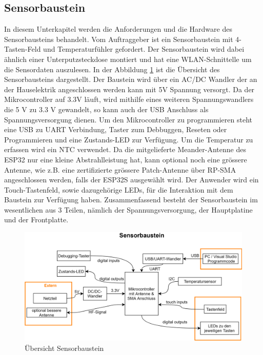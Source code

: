 \subsection{Sensorbaustein}\label{subsec: Sensorbaustein}
\label{sec: Sensorbaustein}
In diesem Unterkapitel werden die Anforderungen und die Hardware des Sensorbausteins behandelt.
Vom Auftraggeber ist ein Sensorbaustein mit 4-Tasten-Feld und Temperaturfühler gefordert. Der Sensorbaustein wird dabei ähnlich einer Unterputzsteckdose montiert und hat eine WLAN-Schnittelle um die Sensordaten auszulesen. In der Abbildung \ref{pic: Uebersicht_Sensorbaustein} ist die Übersicht des Sensorbausteins dargestellt. Der Baustein wird über ein AC/DC Wandler der an der Hauselektrik angeschlossen werden kann mit 5V Spannung versorgt. Da der Mikrocontroller auf 3.3V läuft, wird mithilfe eines weiteren Spannungswandlers die 5 V zu 3.3 V gewandelt, so kann auch der USB Anschluss als Spannungsversorgung dienen. Um den Mikrocontroller zu programmieren steht eine USB zu UART Verbindung, Taster zum Debbuggen, Reseten oder Programmieren und eine Zustands-LED zur Verfügung. Um die Temperatur zu erfassen wird ein NTC verwendet. Da die mitgelieferte Meander-Antenne des ESP32 nur eine kleine Abstrahlleistung hat, kann optional noch eine grössere Antenne, wie z.B. eine zertifizierte grössere Patch-Antenne über RP-SMA angeschlossen werden, falls der ESP32S ausgewählt wird. Der Anwender wird ein Touch-Tastenfeld, sowie dazugehörige LEDs, für die Interaktion mit dem Baustein zur Verfügung haben. Zusammenfassend besteht der Sensorbaustein im wesentlichen aus 3 Teilen, nämlich der Spannungsversorgung, der Hauptplatine und der Frontplatte.

\begin{figure}[H]
	\centering
	\includegraphics[width=\textwidth]{graphics/Sensorbaustein.png}
	\caption{Übersicht Sensorbaustein}
	\label{pic: Uebersicht_Sensorbaustein}
\end{figure} 

